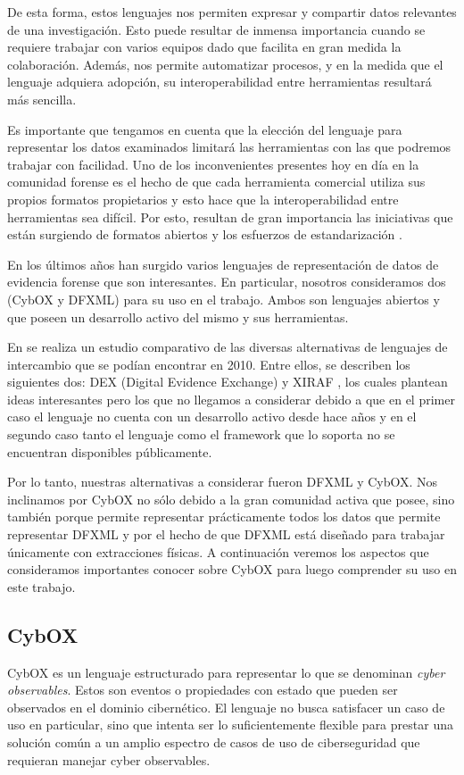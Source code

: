 De esta forma, estos lenguajes nos permiten expresar y compartir datos relevantes de una investigación. Esto puede resultar de inmensa importancia cuando se requiere trabajar con varios equipos dado que facilita en gran medida la colaboración. Además, nos permite automatizar procesos, y en la medida que el lenguaje adquiera adopción, su interoperabilidad entre herramientas resultará más sencilla.

Es importante que tengamos en cuenta que la elección del lenguaje para representar los datos examinados limitará las herramientas con las que podremos trabajar con facilidad. Uno de los inconvenientes presentes hoy en día en la comunidad forense es el hecho de que cada herramienta comercial utiliza sus propios formatos propietarios y esto hace que la interoperabilidad entre herramientas sea difícil. Por esto, resultan de gran importancia las iniciativas que están surgiendo de formatos abiertos y los esfuerzos de estandarización \cite{oasisAdAutomaged}.

En los últimos años han surgido varios lenguajes de representación de datos de evidencia forense que son interesantes. En particular, nosotros consideramos dos (CybOX y DFXML) para su uso en el trabajo. Ambos son lenguajes abiertos y que poseen un desarrollo activo del mismo y sus herramientas.

En \cite{storageAndExchange} se realiza un estudio comparativo de las diversas alternativas de lenguajes de intercambio que se podían encontrar en 2010. Entre ellos, se describen los siguientes dos: DEX (Digital Evidence Exchange) \cite{DexDigitalEvidence} y XIRAF \cite{DexXmlBased}, los cuales plantean ideas interesantes pero los que no llegamos a considerar debido a que en el primer caso el lenguaje no cuenta con un desarrollo activo desde hace años y en el segundo caso tanto el lenguaje como el framework que lo soporta no se encuentran disponibles públicamente. 

Por lo tanto, nuestras alternativas a considerar fueron DFXML y CybOX. Nos inclinamos por CybOX no sólo debido a la gran comunidad activa que posee, sino también porque permite representar prácticamente todos los datos que permite representar DFXML y por el hecho de que DFXML está diseñado para trabajar únicamente con extracciones físicas. A continuación veremos los aspectos que consideramos importantes conocer sobre CybOX para luego comprender su uso en este trabajo.

\subsection{CybOX}
CybOX \cite{cyboxGitHub} es un lenguaje estructurado para representar lo que se denominan \emph{cyber observables}. Estos son eventos o propiedades con estado que pueden ser observados en el dominio cibernético. El lenguaje no busca satisfacer un caso de uso en particular, sino que intenta ser lo suficientemente flexible para prestar una solución común a un amplio espectro de casos de uso de ciberseguridad que requieran manejar cyber observables.

